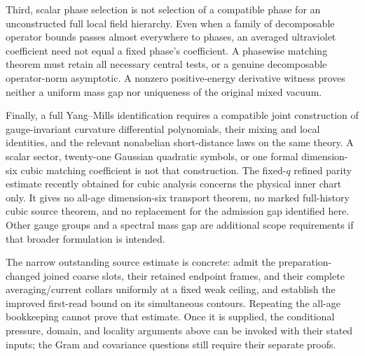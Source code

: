 Third, scalar phase selection is not selection of a compatible phase
for an unconstructed full local field hierarchy.  Even when a family
of decomposable operator bounds passes almost everywhere to phases,
an averaged ultraviolet coefficient need not equal a fixed phase's
coefficient.  A phasewise matching theorem must retain all necessary
central tests, or a genuine decomposable operator-norm asymptotic.
A nonzero positive-energy derivative witness proves neither a uniform
mass gap nor uniqueness of the original mixed vacuum.

Finally, a full Yang--Mills identification requires a compatible joint
construction of gauge-invariant curvature differential polynomials,
their mixing and local identities, and the relevant nonabelian
short-distance laws on the same theory.  A scalar sector, twenty-one
Gaussian quadratic symbols, or one formal dimension-six cubic matching
coefficient is not that construction.  The fixed-$q$ refined parity
estimate recently obtained for cubic analysis concerns the physical
inner chart only.  It gives no all-age dimension-six transport theorem,
no marked full-history cubic source theorem, and no replacement for
the admission gap identified here.  Other gauge groups and a spectral
mass gap are additional scope requirements if that broader formulation
is intended.

The narrow outstanding source estimate is concrete: admit the
preparation-changed joined coarse slots, their retained endpoint frames,
and their complete averaging/current collars uniformly at a fixed
weak ceiling, and establish the improved first-read bound on its
simultaneous contours.  Repeating the all-age bookkeeping cannot prove
that estimate.  Once it is supplied, the conditional pressure, domain,
and locality arguments above can be invoked with their stated inputs;
the Gram and covariance questions still require their separate proofs.

